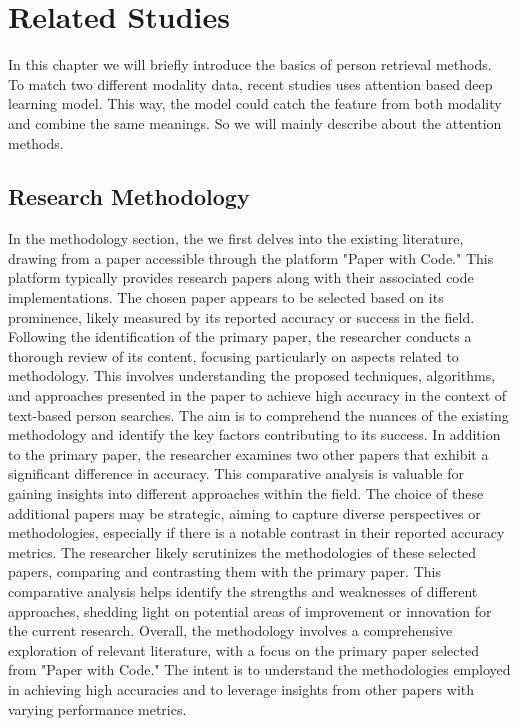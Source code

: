 \chapter{Related Studies }
In this chapter we will briefly introduce the basics of person retrieval methods. To match two different modality data, recent studies uses attention based deep learning model. This way, the model could catch the feature from both modality and combine the same meanings. So we will mainly describe about the attention methods.


\section{Research Methodology}
In the methodology section, the we first delves into the existing literature, drawing from a paper accessible through the platform "Paper with Code." This platform typically provides research papers along with their associated code implementations. The chosen paper appears to be selected based on its prominence, likely measured by its reported accuracy or success in the field.
Following the identification of the primary paper, the researcher conducts a thorough review of its content, focusing particularly on aspects related to methodology. This involves understanding the proposed techniques, algorithms, and approaches presented in the paper to achieve high accuracy in the context of text-based person searches. The aim is to comprehend the nuances of the existing methodology and identify the key factors contributing to its success.
In addition to the primary paper, the researcher examines two other papers that exhibit a significant difference in accuracy. This comparative analysis is valuable for gaining insights into different approaches within the field. The choice of these additional papers may be strategic, aiming to capture diverse perspectives or methodologies, especially if there is a notable contrast in their reported accuracy metrics.
The researcher likely scrutinizes the methodologies of these selected papers, comparing and contrasting them with the primary paper. This comparative analysis helps identify the strengths and weaknesses of different approaches, shedding light on potential areas of improvement or innovation for the current research.
Overall, the methodology involves a comprehensive exploration of relevant literature, with a focus on the primary paper selected from "Paper with Code." The intent is to understand the methodologies employed in achieving high accuracies and to leverage insights from other papers with varying performance metrics. 

